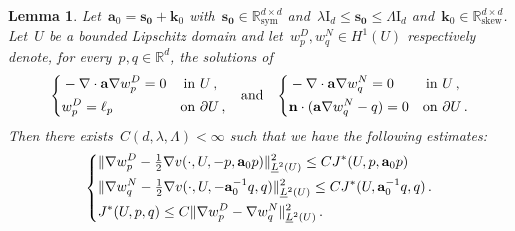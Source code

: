 \documentclass[11pt,twoside]{article} %
\numberwithin{equation}{section}
\newtheorem{lemma}[theorem]{Lemma}
\theoremstyle{definition}
\let\originalleft\left
\let\originalright\right
\renewcommand{\left}{\mathopen{}\mathclose\bgroup\originalleft}
\renewcommand{\right}{\aftergroup\egroup\originalright}
\newcommand*{\Id}{\ensuremath{\mathrm{I}_d}}
\newcommand*{\R}{\ensuremath{\mathbb{R}}}
\newcommand*{\Rd}{\ensuremath{\mathbb{R}^d}}
\newcommand{\s}{\mathbf{s}}
\renewcommand{\a}{\mathbf{a}}
\renewcommand{\k}{\mathbf{k}}
\newcommand{\bfzero}{\boldsymbol{0}}
\begin{document}
\begin{lemma}
\label{l.Dirichlet.to.Neumann}
Let~$\a_0 = \s_{\bfzero} +\k_0$ with~$\s_{\bfzero} \in \R^{d\times d}_{\mathrm{sym}}$ and~$\lambda \Id \leq \s_{\bfzero} \leq \Lambda \Id$ and~$\k_0\in\R^{d\times d}_{\mathrm{skew}}$. 
Let~$U$ be a bounded Lipschitz domain and let~$w^D_p, w^N_{q} \in H^1(U)$ respectively denote, for every~$p,q\in\Rd$, the solutions of
\begin{equation}
\label{e.DirNeu.P}
\left\{
\begin{aligned}
& -\nabla\cdot \a \nabla w^D_p = 0 & \mbox{in} & \ U\,, \\ 
& w^D_p = \ell_p & \mbox{on} & \ \partial U\,,
\end{aligned}
\right.
\quad \mbox{and} \quad 
\left\{
\begin{aligned}
& -\nabla\cdot \a \nabla w^N_q = 0 & \mbox{in} & \ U\,, \\ 
& \mathbf{n} \cdot (\a \nabla w^N_{q} - q) = 0 & \mbox{on} & \ \partial U\,.
\end{aligned}
\right.
\end{equation}
Then there exists~$C(d,\lambda,\Lambda)<\infty$ such that we have the following estimates:
\begin{equation}
\label{e.DirNeu.P.est}
\left\{ 
\begin{aligned}
&
\| \nabla w^D_p - \tfrac12\nabla v(\cdot,U,-p, \a_0 p) \|_{\underline{L}^2(U)}^2 
\leq 
C J^*(U,p, \a_0 p )
\\ &
\| \nabla w^N_q - \tfrac12\nabla v(\cdot,U,-\a_0^{-1}q, q) \|_{\underline{L}^2(U)} ^2
\leq 
C J^*(U,\a_0^{-1}q, q)\,.
\\ & 
J^*(U,p, q )
\leq
C \| \nabla w^D_p - \nabla w^N_{q} \|_{\underline{L}^2(U)}^2
\,.
\end{aligned}
\right. 
\end{equation}
\end{lemma}
\end{document}
